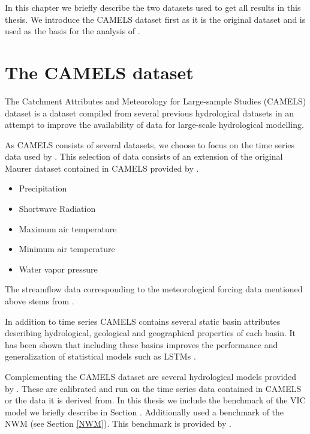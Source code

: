 In this chapter we briefly describe the two datasets used to get all results in 
this thesis. We introduce the CAMELS dataset \citep{CAMELS_US} first as it is the 
original dataset and is used as the basis for the analysis of \citet{lstm_first_paper, lstm_second_paper, lstm_third_paper}.
\section{The CAMELS dataset}
The Catchment Attributes and Meteorology for Large-sample Studies (CAMELS) dataset \citep{CAMELS_US}
is a dataset compiled from several previous hydrological datasets in an attempt to 
improve the availability of data for large-scale hydrological modelling.

As CAMELS consists of several datasets, we choose to focus on the time series data 
used by \citet{lstm_second_paper}. This selection of data consists of an extension 
of the original Maurer dataset \citationneeded contained in CAMELS provided by \citet{maurer_hydroshare}. 
\begin{itemize}
    \item Precipitation
    \item Shortwave Radiation
    \item Maximum air temperature
    \item Minimum air temperature
    \item Water vapor pressure
\end{itemize}

The streamflow data corresponding to the meteorological forcing data mentioned above 
stems from \citet{usgs_streamflow}.

In addition to time series CAMELS contains several static basin attributes describing 
hydrological, geological and geographical properties of each basin. It has been 
shown that including these basins improves the performance and generalization of 
statistical models such as LSTMs \cite{lstm_second_paper}. 

Complementing the CAMELS dataset are several hydrological models provided by \citet{CAMELS_hydroshare}. 
These are calibrated and run on the time series data contained in CAMELS or the data 
it is derived from. In this thesis we include the benchmark of the VIC model we 
briefly describe in Section \cite{VIC}. Additionally \citet{lstm_third_paper} used 
a benchmark of the NWM (see Section \ref{NWM}). This benchmark is provided by 
\cite{NWM_benchmark}. 


